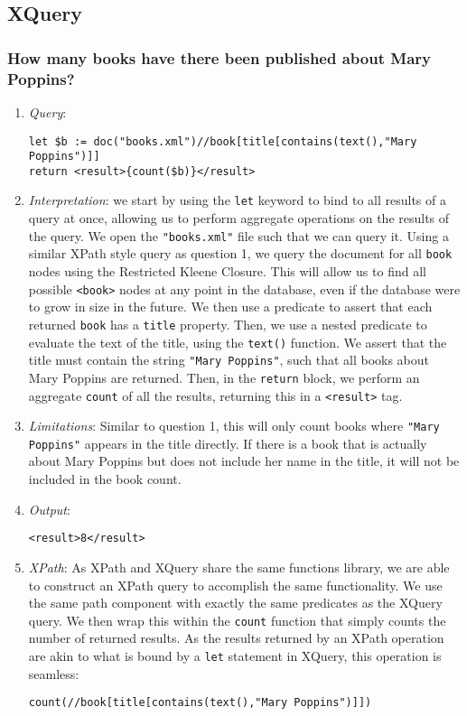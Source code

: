 \documentclass[11pt]{article}
\begin{document}
\subsection{XQuery}

\subsubsection{How many books have there been published about Mary Poppins?}

\begin{enumerate}
\item \textit{Query}:
\begin{small}
\begin{verbatim}
let $b := doc("books.xml")//book[title[contains(text(),"Mary Poppins")]]
return <result>{count($b)}</result>
\end{verbatim}
\end{small}
\item \textit{Interpretation}: we start by using the \texttt{let} keyword to bind to all results of a query at once, allowing us to perform aggregate operations on the results of the query. We open the \texttt{"books.xml"} file such that we can query it. Using a similar XPath style query as question 1, we query the document for all \texttt{book} nodes using the Restricted Kleene Closure. This will allow us to find all possible \texttt{<book>} nodes at any point in the database, even if the database were to grow in size in the future. We then use a predicate to assert that each returned \texttt{book} has a \texttt{title} property. Then, we use a nested predicate to evaluate the text of the title, using the \texttt{text()} function. We assert that the title must contain the string \texttt{"Mary Poppins"}, such that all books about Mary Poppins are returned. Then, in the \texttt{return} block, we perform an aggregate \texttt{count} of all the results, returning this in a \texttt{<result>} tag.
\item \textit{Limitations}: Similar to question 1, this will only count books where \texttt{"Mary Poppins"} appears in the title directly. If there is a book that is actually about Mary Poppins but does not include her name in the title, it will not be included in the book count.
\item \textit{Output}:
\begin{verbatim}
<result>8</result>
\end{verbatim} 
\item \textit{XPath}: As XPath and XQuery share the same functions library, we are able to construct an XPath query to accomplish the same functionality. We use the same path component with exactly the same predicates as the XQuery query. We then wrap this within the \texttt{count} function that simply counts the number of returned results. As the results returned by an XPath operation are akin to what is bound by a \texttt{let} statement in XQuery, this operation is seamless:
\begin{verbatim}
count(//book[title[contains(text(),"Mary Poppins")]])
\end{verbatim}
\end{enumerate}
\end{document}
